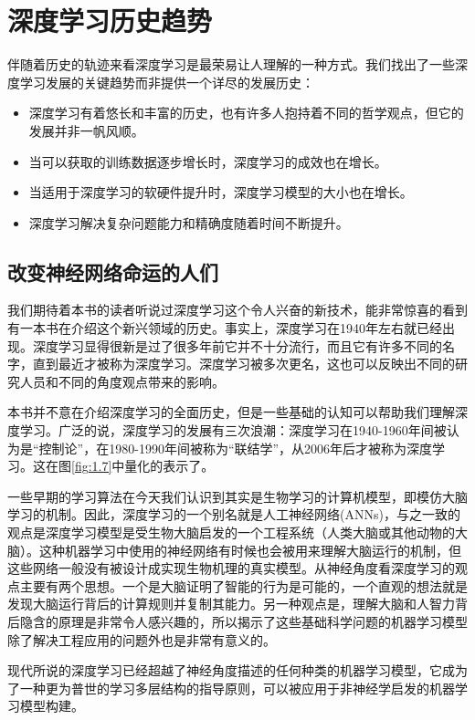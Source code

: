 \documentclass[a4paper,11pt]{book}
\begin{document}
\section{深度学习历史趋势}
伴随着历史的轨迹来看深度学习是最荣易让人理解的一种方式。我们找出了一些深度学习发展的关键趋势而非提供一个详尽的发展历史：

\begin{itemize}
\item 深度学习有着悠长和丰富的历史，也有许多人抱持着不同的哲学观点，但它的发展并非一帆风顺。
\item 当可以获取的训练数据逐步增长时，深度学习的成效也在增长。
\item 当适用于深度学习的软硬件提升时，深度学习模型的大小也在增长。
\item 深度学习解决复杂问题能力和精确度随着时间不断提升。
\end{itemize}

\subsection{改变神经网络命运的人们}
我们期待着本书的读者听说过深度学习这个令人兴奋的新技术，能非常惊喜的看到有一本书在介绍这个新兴领域的历史。事实上，深度学习在1940年左右就已经出现。深度学习显得很新是过了很多年前它并不十分流行，而且它有许多不同的名字，直到最近才被称为深度学习。深度学习被多次更名，这也可以反映出不同的研究人员和不同的角度观点带来的影响。


本书并不意在介绍深度学习的全面历史，但是一些基础的认知可以帮助我们理解深度学习。广泛的说，深度学习的发展有三次浪潮：深度学习在1940-1960年间被认为是“控制论”，在1980-1990年间被称为“联结学”，从2006年后才被称为深度学习。这在图\ref{fig:1.7}中量化的表示了。


一些早期的学习算法在今天我们认识到其实是生物学习的计算机模型，即模仿大脑学习的机制。因此，深度学习的一个别名就是人工神经网络(ANNs)，与之一致的观点是深度学习模型是受生物大脑启发的一个工程系统（人类大脑或其他动物的大脑）。这种机器学习中使用的神经网络有时候也会被用来理解大脑运行的机制，但这些网络一般没有被设计成实现生物机理的真实模型。从神经角度看深度学习的观点主要有两个思想。一个是大脑证明了智能的行为是可能的，一个直观的想法就是发现大脑运行背后的计算规则并复制其能力。另一种观点是，理解大脑和人智力背后隐含的原理是非常令人感兴趣的，所以揭示了这些基础科学问题的机器学习模型除了解决工程应用的问题外也是非常有意义的。


现代所说的深度学习已经超越了神经角度描述的任何种类的机器学习模型，它成为了一种更为普世的学习多层结构的指导原则，可以被应用于非神经学启发的机器学习模型构建。
\end{document}
